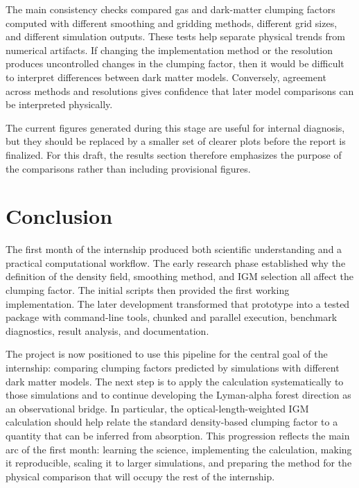 \documentclass[
    aps,
    prd,
    preprint,
    onecolumn,
    nofootinbib,
    groupedaddress
]{revtex4-2}
\begin{document}
The main consistency checks compared gas and dark-matter clumping factors computed with different smoothing and gridding methods, different grid sizes, and different simulation outputs. These tests help separate physical trends from numerical artifacts. If changing the implementation method or the resolution produces uncontrolled changes in the clumping factor, then it would be difficult to interpret differences between dark matter models. Conversely, agreement across methods and resolutions gives confidence that later model comparisons can be interpreted physically.

The current figures generated during this stage are useful for internal diagnosis, but they should be replaced by a smaller set of clearer plots before the report is finalized. For this draft, the results section therefore emphasizes the purpose of the comparisons rather than including provisional figures.

\section{Conclusion}

The first month of the internship produced both scientific understanding and a practical computational workflow. The early research phase established why the definition of the density field, smoothing method, and IGM selection all affect the clumping factor. The initial scripts then provided the first working implementation. The later development transformed that prototype into a tested package with command-line tools, chunked and parallel execution, benchmark diagnostics, result analysis, and documentation.

The project is now positioned to use this pipeline for the central goal of the internship: comparing clumping factors predicted by simulations with different dark matter models. The next step is to apply the calculation systematically to those simulations and to continue developing the Lyman-alpha forest direction as an observational bridge. In particular, the optical-length-weighted IGM calculation should help relate the standard density-based clumping factor to a quantity that can be inferred from absorption. This progression reflects the main arc of the first month: learning the science, implementing the calculation, making it reproducible, scaling it to larger simulations, and preparing the method for the physical comparison that will occupy the rest of the internship.
\end{document}
